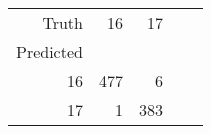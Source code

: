 \begin{table}[h]
\centering
\label{table:5}
\begin{tabular}{rrrrr}
\toprule
Truth & 16 & 17 \\
Predicted &  &  \\
\midrule
16 & 477 & 6 \\
17 & 1 & 383 \\
\bottomrule
\end{tabular}
\end{table}
